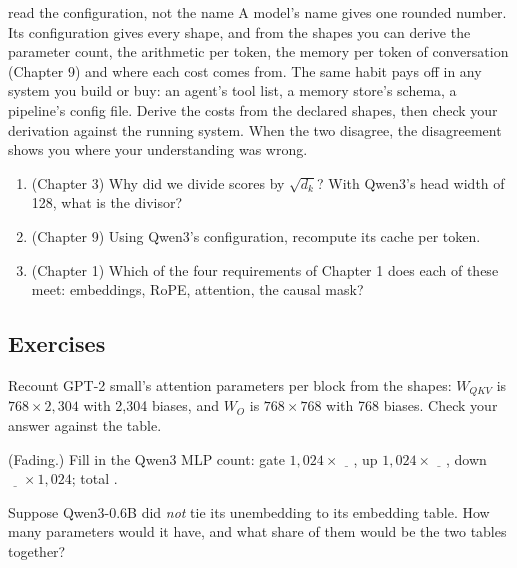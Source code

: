 \begin{principle}{read the configuration, not the name}
A model's name gives one rounded number. Its configuration gives every shape, and from the shapes you can derive
the parameter count, the arithmetic per token, the memory per token of conversation (Chapter 9) and where each
cost comes from. The same habit pays off in any system you build or buy: an agent's tool list, a memory
store's schema, a pipeline's config file. Derive the costs from the declared shapes, then check your derivation
against the running system. When the two disagree, the disagreement shows you where your understanding was wrong.
\end{principle}

\begin{lookingback}
\begin{enumerate}[label=\arabic*.,leftmargin=1.6em]
\item (Chapter 3) Why did we divide scores by $\sqrt{d_k}$? With Qwen3's head width of 128, what is the divisor?
\item (Chapter 9) Using Qwen3's configuration, recompute its cache per token.
\item (Chapter 1) Which of the four requirements of Chapter 1 does each of these meet: embeddings, RoPE,
attention, the causal mask?
\end{enumerate}
\end{lookingback}

\subsection*{Exercises}

\begin{exercise}
Recount GPT-2 small's attention parameters per block from the shapes: $W_{QKV}$ is $768\times2{,}304$ with 2{,}304
biases, and $W_O$ is $768\times768$ with 768 biases. Check your answer against the table.
\end{exercise}

\begin{exercise}
(Fading.) Fill in the Qwen3 MLP count: gate $1{,}024\times\underline{\quad}$, up $1{,}024\times\underline{\quad}$,
down $\underline{\quad}\times1{,}024$; total \underline{\quad}.
\end{exercise}

\begin{exercise}
Suppose Qwen3-0.6B did \emph{not} tie its unembedding to its embedding table. How many parameters would it have,
and what share of them would be the two tables together?
\end{exercise}

